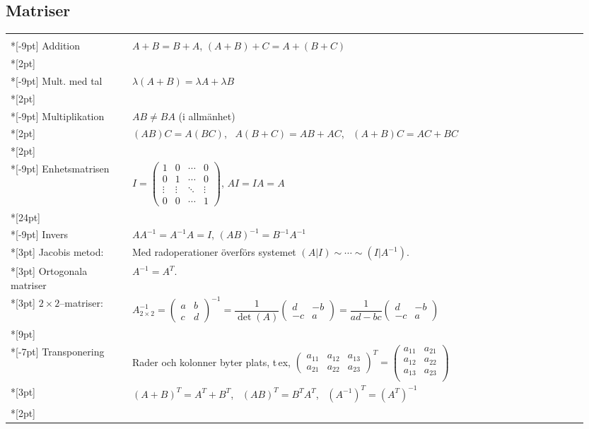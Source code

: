 \documentclass[a4paper]{article}
\begin{document}
\subsection*{Matriser}

\begin{tabular}{|p{0.2\linewidth}|p{0.75\linewidth}|}
  \hline & \\*[-9pt]
  Addition & $A+B=B+A$, $(A+B)+C=A+(B+C)$
  \\*[2pt]\hline & \\*[-9pt]
  Mult. med tal & $\lambda(A+B)=\lambda A+\lambda B$
  \\*[2pt]\hline & \\*[-9pt]
  Multiplikation&$AB\ne BA$ (i allmänhet) 
  \\*[2pt]
  &$(AB)C=A(BC)$, \ $A(B+C)=AB+AC$, \  $(A+B)C=AC+BC$
  \\*[2pt]\hline & \\*[-9pt]
  Enhetsmatrisen&$I=
  \begin{pmatrix}
    1&0&\cdots&0\\
    0&1&\cdots&0\\
    \vdots&\vdots&\ddots&\vdots\\
    0&0&\cdots&1
  \end{pmatrix}
  $, $AI=IA=A$
  \\*[24pt]\hline & \\*[-9pt]
  Invers &$AA^{-1}=A^{-1}A=I$, $(AB)^{-1}=B^{-1}A^{-1}$\\*[3pt]
  Jacobis metod:& Med radoperationer överförs systemet $(A|I)\sim \cdots\sim (I|A^{-1})$.
  \\*[3pt]
  Ortogonala matriser & $A^{-1}=A^T$.
  \\*[3pt]
  $2\times 2$--matriser:&
  $A_{2\times2}^{-1}
  =\begin{pmatrix}a&b\\c&d\end{pmatrix}^{-1}
  =\dfrac1{\det(A)}\begin{pmatrix}d&-b\\-c&a\end{pmatrix}
  =\dfrac1{ad-bc}\begin{pmatrix}d&-b\\-c&a\end{pmatrix}$
  \\*[9pt]\hline  & \\*[-7pt]
  Transponering &
  Rader och kolonner byter plats, t\,ex, 
  $ \begin{pmatrix}a_{11}&a_{12}&a_{13}\\a_{21}&a_{22}&a_{23}\end{pmatrix}^T=
    \begin{pmatrix}a_{11}&a_{21}\\a_{12}&a_{22}\\a_{13}&a_{23}\\\end{pmatrix}$\\*[3pt]
  &$(A+B)^T=A^T+B^T$, \ 
  $(AB)^T=B^TA^T$, \ 
  $(A^{-1})^T=(A^T)^{-1}$\\*[2pt]
  \hline
\end{tabular}
\end{document}
